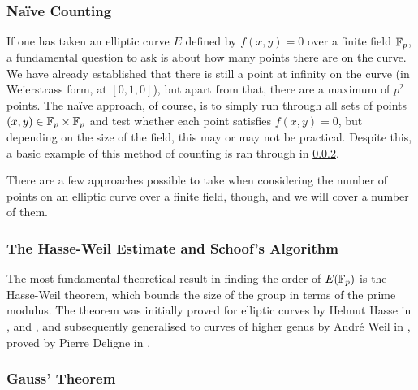 \subsubsection{Naïve Counting}
If one has taken an elliptic curve $E$ defined by $f(x,y)=0$ over a finite field $\mathbb{F}_{p}$, a fundamental question to ask is about how many points there are on the curve.
We have already established that there is still a point at infinity on the curve (in Weierstrass form, at $[0,1,0]$), but apart from that, there are a maximum of $p^2$ points. %
The naïve approach, of course, is to simply run through all sets of points $(x,y) \in \mathbb{F}_{p} \times \mathbb{F}_{p}$ and test whether each point satisfies $f(x,y)=0$, but depending on the size of the field, this may or may not be practical.
Despite this, a basic example of this method of counting is ran through in \cref{hasseweil}.

There are a few approaches possible to take when considering the number of points on an elliptic curve over a finite field, though, and we will cover a number of them.
\subsubsection{The Hasse-Weil Estimate and Schoof's Algorithm}
\label{hasseweil}
The most fundamental theoretical result in finding the order of $E(\mathbb{F}_{p})$ is the Hasse-Weil theorem, which bounds the size of the group in terms of the prime modulus.
The theorem was initially proved for elliptic curves by Helmut Hasse in \cite{hasse1936a}, \cite{hasse1936b} and \cite{hasse1936c}, and subsequently generalised to curves of higher genus by André Weil in \cite{weil1948}, proved by Pierre Deligne in \cite{deligne1974}.

\subsubsection{Gauss' Theorem}


